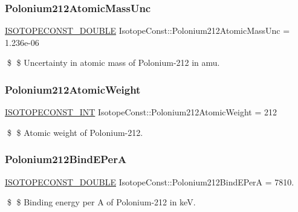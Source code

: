 \subsubsection{\texorpdfstring{Polonium212\+Atomic\+Mass\+Unc}{Polonium212AtomicMassUnc}}
{\footnotesize\ttfamily \mbox{\hyperlink{group___isotope_const-_macros_ga8f45a7272ce02c0b4c65c44636ed719a}{I\+S\+O\+T\+O\+P\+E\+C\+O\+N\+S\+T\+\_\+\+D\+O\+U\+B\+LE}} Isotope\+Const\+::\+Polonium212\+Atomic\+Mass\+Unc = 1.\+236e-\/06}

\$ \$ Uncertainty in atomic mass of Polonium-\/212 in amu. \mbox{\label{group___isotope_const-_polonium-_po212_gaceef7c4660d054ac83d2ba0ff964f48a}} 
\subsubsection{\texorpdfstring{Polonium212\+Atomic\+Weight}{Polonium212AtomicWeight}}
{\footnotesize\ttfamily \mbox{\hyperlink{group___isotope_const-_macros_ga5f18360b3e99483a35c32d789e62621c}{I\+S\+O\+T\+O\+P\+E\+C\+O\+N\+S\+T\+\_\+\+I\+NT}} Isotope\+Const\+::\+Polonium212\+Atomic\+Weight = 212}

\$ \$ Atomic weight of Polonium-\/212. \mbox{\label{group___isotope_const-_polonium-_po212_ga28efac5e937b611e9b92b23c3d649181}} 
\subsubsection{\texorpdfstring{Polonium212\+Bind\+E\+PerA}{Polonium212BindEPerA}}
{\footnotesize\ttfamily \mbox{\hyperlink{group___isotope_const-_macros_ga8f45a7272ce02c0b4c65c44636ed719a}{I\+S\+O\+T\+O\+P\+E\+C\+O\+N\+S\+T\+\_\+\+D\+O\+U\+B\+LE}} Isotope\+Const\+::\+Polonium212\+Bind\+E\+PerA = 7810.}

\$ \$ Binding energy per A of Polonium-\/212 in keV. \mbox{\label{group___isotope_const-_polonium-_po212_gaca3aa0a4df7baaae775e83ad1582486b}} 
